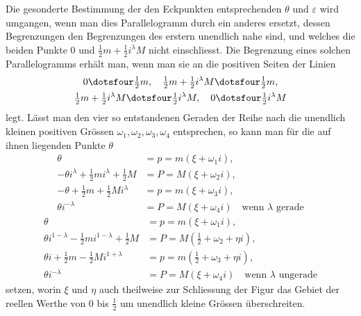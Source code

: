 Die gesonderte Bestimmung der den Eckpunkten entsprechenden $\theta$ und $\varepsilon$ wird umgangen, wenn man dies Parallelogramm durch ein anderes ersetzt, dessen Begrenzungen den Begrenzungen des erstern
%
unendlich nahe sind, und welches die beiden Punkte $0$ und $\tfrac12m+\tfrac12i^\lambda M$ nicht einschliesst. Die Begrenzung eines solchen Parallelogramms erhält man, wenn man sie an die positiven Seiten der Linien
\[
\begin{gathered}
0\dotsfour\tfrac12m,\quad\tfrac12m+\tfrac12i^\lambda M\dotsfour\tfrac12m,\\
\tfrac12m+\tfrac12i^\lambda M\dotsfour\tfrac12i^\lambda M,\quad 0\dotsfour\tfrac12i^\lambda M
\end{gathered}
\]
legt. Lässt man den vier so entstandenen Geraden der Reihe nach die unendlich kleinen positiven Grössen $\omega_1,\omega_2,\omega_3,\omega_4$ entsprechen, so kann man für die auf ihnen liegenden Punkte $\theta$
\[
\begin{aligned}
\theta&=p=m(\xi+\omega_1i),\\
-\theta i^\lambda+\tfrac12mi^\lambda+\tfrac12M&=P=M(\xi+\omega_2i),\\
-\theta+\tfrac12m+\tfrac12Mi^\lambda&=p=m(\xi+\omega_3i),\\
\theta i^{-\lambda}&=P=M(\xi+\omega_4i)\quad\text{wenn }\lambda\text{ gerade}
\end{aligned}
\]
\[
\begin{aligned}
\theta&=p=m(\xi+\omega_1i),\\
\theta i^{1-\lambda}-\tfrac12mi^{1-\lambda}+\tfrac12M&=P=M(\tfrac12+\omega_2+\eta i),\\
\theta i+\tfrac12m-\tfrac12Mi^{1+\lambda}&=p=m(\tfrac12+\omega_3+\eta i),\\
\theta i^{-\lambda}&=P=M(\xi+\omega_4i)\quad\text{wenn }\lambda\text{ ungerade}
\end{aligned}
\]
setzen, worin $\xi$ und $\eta$ auch theilweise zur Schliessung der Figur das Gebiet der reellen Werthe von $0$ bis $\tfrac12$ um unendlich kleine Grössen überschreiten.

